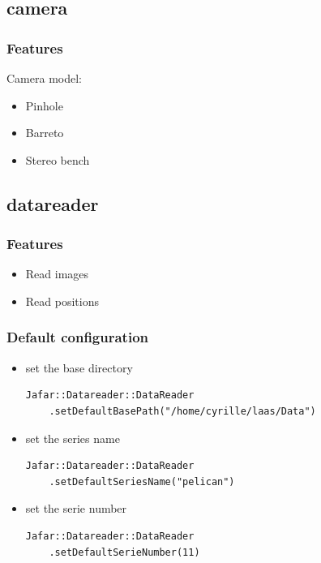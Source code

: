 \documentclass[compress]{beamer}
\begin{document}

\subsection{camera}
\begin{frame}
  \frametitle{Features}
  Camera model:
  \begin{itemize}
   \item Pinhole
   \item Barreto
   \item Stereo bench
  \end{itemize}

\end{frame}


\subsection{datareader}
\begin{frame}
  \frametitle{Features}
  \begin{itemize}
    \item<1-> Read images
    \item<2-> Read positions
  \end{itemize}
\end{frame}
\begin{frame}[fragile]
  \frametitle{Default configuration}
    \begin{itemize}
      \item<1-> set the base directory
        \begin{lstlisting}
Jafar::Datareader::DataReader
    .setDefaultBasePath("/home/cyrille/laas/Data")
        \end{lstlisting}
      \item<2-> set the series name
        \begin{lstlisting}
Jafar::Datareader::DataReader
    .setDefaultSeriesName("pelican")
        \end{lstlisting}
      \item<3-> set the serie number
        \begin{lstlisting}
Jafar::Datareader::DataReader
    .setDefaultSerieNumber(11)
        \end{lstlisting}
    \end{itemize}
\end{frame}
\end{document}
